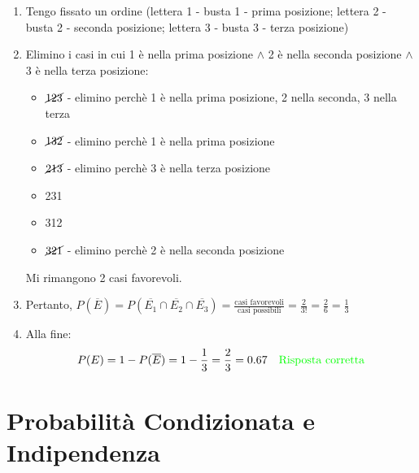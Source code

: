 \documentclass{article}  %
\theoremstyle{definition}
\begin{document}
\begin{esercizio}[Esercizio]
\begin{enumerate}
\begin{itemize}
			      \item 132
			      \item 213
			      \item 231
			      \item 312
			      \item 321
		      \end{itemize}
		\item Tengo fissato un ordine (lettera 1 - busta 1 - prima posizione; lettera 2 - busta 2 - seconda posizione; lettera 3 - busta 3 - terza posizione)
		\item Elimino i casi in cui 1 è nella prima posizione $\land$ 2 è nella seconda posizione $\land$ 3 è nella terza posizione:
		      \begin{itemize}
			      \item $\cancel{123}$ - elimino perchè 1 è nella prima posizione, 2 nella seconda, 3 nella terza
			      \item $\cancel{132}$ - elimino perchè 1 è nella prima posizione
			      \item $\cancel{213}$ - elimino perchè 3 è nella terza posizione
			      \item 231
			      \item 312
			      \item $\cancel{321}$ - elimino perchè 2 è nella seconda posizione
		      \end{itemize}
		      Mi rimangono 2 casi favorevoli.
		\item Pertanto, $P(\overline{E})=P(\overline{E_1} \cap \overline{E_2} \cap \overline{E_3})=\frac{\text{casi favorevoli}}{\text{casi possibili}}=\frac{2}{3!}=\frac{2}{6}=\frac{1}{3}$
		\item Alla fine:
		      \[
			      P(E)=1-P(\overline{E})=1-\frac{1}{3}=\frac{2}{3}=0.67 \quad \textcolor{green}{\text{Risposta corretta}}
		      \]
	\end{enumerate}

\end{esercizio}

\break
\section{Probabilità Condizionata e Indipendenza}
\end{document}
